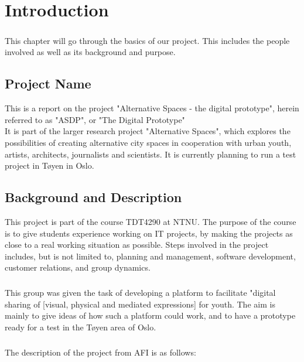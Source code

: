 \chapter{Introduction}

\paragraph{} This chapter will go through the basics of our project. This includes the people involved as well as its background and purpose.

\section{Project Name} 
This is a report on the project "Alternative Spaces - the digital prototype", herein referred to as "ASDP", or "The Digital Prototype"\\
\indent It is part of the larger research project "Alternative Spaces", which explores the possibilities of creating alternative city spaces in cooperation with urban youth, artists, architects, journalists and scientists. It is currently planning to run a test project in T\o yen in Oslo.

\section{Background and Description}
This project is part of the course TDT4290 at NTNU. The purpose of the course is to give students experience working on IT projects, by making the projects as close to a real working situation as possible. Steps involved in the project includes, but is not limited to, planning and management, software development, customer relations, and group dynamics.
\paragraph*{} This group was given the task of developing a platform to facilitate "digital sharing of [visual, physical and mediated expressions] for youth. The aim is mainly to give ideas of how such a platform could work, and to have a prototype ready for a test in the T\o yen area of Oslo.
\paragraph*{} The description of the project from AFI is as follows:
